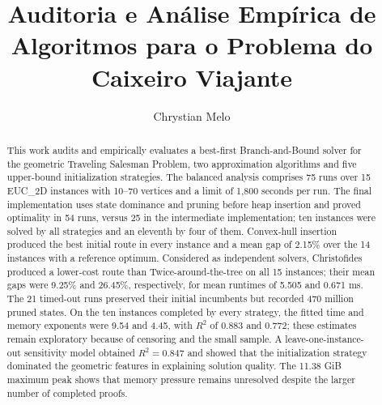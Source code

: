 \documentclass[12pt]{article}
\title{Auditoria e Análise Empírica de Algoritmos para o Problema do
Caixeiro Viajante}
\author{Chrystian Melo}
\begin{document}
\maketitle

\begin{abstract}
This work audits and empirically evaluates a best-first Branch-and-Bound solver
for the geometric Traveling Salesman Problem, two approximation algorithms and
five upper-bound initialization strategies.  The balanced analysis comprises
75 runs over 15 EUC\_2D instances with 10--70 vertices and a limit of 1,800
seconds per run.  The final implementation uses state dominance and pruning
before heap insertion and proved optimality in 54 runs, versus 25 in the
intermediate implementation; ten instances were solved by all strategies and
an eleventh by four of them.  Convex-hull insertion produced the best initial route in every
instance and a mean gap of 2.15\% over the 14 instances with a reference
optimum.  Considered as independent solvers, Christofides produced a lower-cost
route than Twice-around-the-tree on all 15 instances; their mean gaps were
9.25\% and 26.45\%, respectively, for mean runtimes of 5.505 and 0.671 ms.
The 21 timed-out runs preserved their initial incumbents but recorded 470
million pruned states.  On the ten instances completed by every strategy, the
fitted time and memory exponents were 9.54 and 4.45, with $R^2$ of 0.883 and
0.772; these estimates remain exploratory because of censoring and the small
sample.  A leave-one-instance-out sensitivity model obtained $R^2=0.847$ and
showed that the initialization strategy dominated the geometric features in
explaining solution quality.  The 11.38 GiB maximum peak shows that memory
pressure remains unresolved despite the larger number of completed proofs.
\end{abstract}
\end{document}
